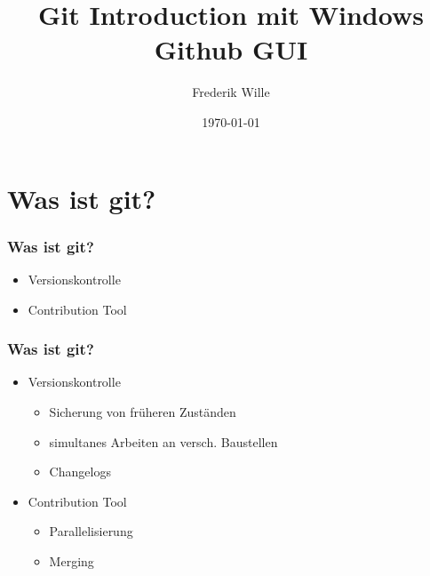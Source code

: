 \documentclass{beamer}
\begin{document}
\title{Git Introduction mit Windows Github GUI}  
\author{Frederik Wille}

\date{\today} 

\begin{frame}
\titlepage
\end{frame} 

\section{Was ist git?}

\begin{frame}
\frametitle{Was ist git?}
\begin{itemize}
\item Versionskontrolle
\item Contribution Tool
\end{itemize}
\end{frame}

\begin{frame}
\frametitle{Was ist git?}
\begin{itemize}
\item Versionskontrolle
\begin{itemize}
\item Sicherung von fr\"uheren Zust\"anden
\item simultanes Arbeiten an versch. Baustellen
\item Changelogs
\end{itemize}
\item Contribution Tool
\begin{itemize}
\item Parallelisierung
\item Merging
\end{itemize}
\end{itemize}
\end{frame}

%
\end{document}

